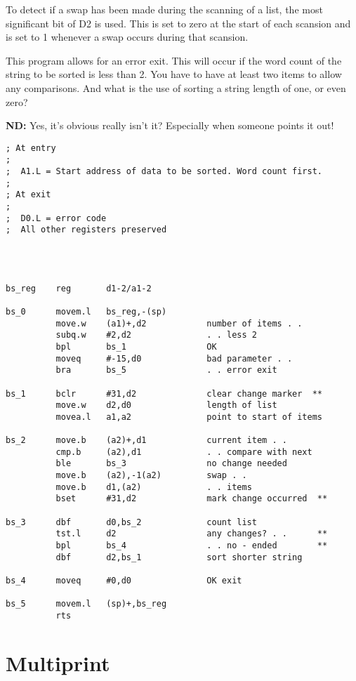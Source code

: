 To detect if a swap has been made during the scanning of a list, the most significant bit of D2 is used. This is set to zero at the start of each scansion and is set to 1 whenever a swap occurs during that scansion.

This program allows for an error exit. This will occur if the word count of
the string to be sorted is less than 2. You have to have at least two items
to allow any comparisons. And what is the use of sorting a string length of
one, or even zero?

\textbf{ND: }Yes, it's obvious really isn't it? Especially when someone points it out!


\begin{lstlisting}[firstnumber=1,caption={Even Better Bubblesort!}]
; At entry
;
;  A1.L = Start address of data to be sorted. Word count first.
;
; At exit
;
;  D0.L = error code
;  All other registers preserved




bs_reg    reg       d1-2/a1-2

bs_0      movem.l   bs_reg,-(sp)
          move.w    (a1)+,d2            number of items . .
          subq.w    #2,d2               . . less 2
          bpl       bs_1                OK
          moveq     #-15,d0             bad parameter . .
          bra       bs_5                . . error exit

bs_1      bclr      #31,d2              clear change marker  **
          move.w    d2,d0               length of list
          movea.l   a1,a2               point to start of items

bs_2      move.b    (a2)+,d1            current item . .
          cmp.b     (a2),d1             . . compare with next
          ble       bs_3                no change needed
          move.b    (a2),-1(a2)         swap . .
          move.b    d1,(a2)             . . items
          bset      #31,d2              mark change occurred  **

bs_3      dbf       d0,bs_2             count list
          tst.l     d2                  any changes? . .      **
          bpl       bs_4                . . no - ended        **
          dbf       d2,bs_1             sort shorter string

bs_4      moveq     #0,d0               OK exit

bs_5      movem.l   (sp)+,bs_reg
          rts
\end{lstlisting}


\section{Multiprint}


